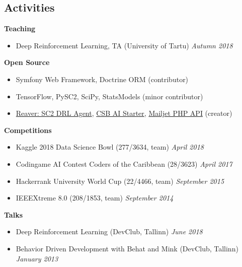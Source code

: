 \documentclass[margin,line]{res}
\begin{document}
\begin{resume}
\section{\sc Activities}
{\bf Teaching}
\begin{itemize}
    \item[ ] Deep Reinforcement Learning, TA (University of Tartu) \hfill {\it Autumn 2018}
\end{itemize}

\vspace*{-.1in}
{\bf Open Source}
\begin{itemize}
    \item[ ] Symfony Web Framework, Doctrine ORM (contributor)
    \item[ ] TensorFlow, PySC2, SciPy, StatsModels (minor contributor)
    \item[ ] \href{https://github.com/Inoryy/reaver-pysc2}{Reaver: SC2 DRL Agent}, \href{https://github.com/Inoryy/csb-ai-starter}{CSB AI Starter}, \href{https://github.com/KnpLabs/mailjet-api-php}{Mailjet PHP API} (creator)
\end{itemize}

\vspace*{-.1in}
{\bf Competitions}
\begin{itemize}
\item[ ] Kaggle 2018 Data Science Bowl (277/3634, team) \hfill {\it April 2018}
\item[ ] Codingame AI Contest Coders of the Caribbean (28/3623) \hfill {\it April 2017}
\item[ ] Hackerrank University World Cup (22/4466, team) \hfill {\it September 2015}
\item[ ] IEEEXtreme 8.0 (208/1853, team) \hfill {\it September 2014}
\end{itemize}

\vspace*{-.1in}
{\bf Talks}
\begin{itemize}
    \item[ ] Deep Reinforcement Learning (DevClub, Tallinn) \hfill {\it June 2018}
    \item[ ] Behavior Driven Development with Behat and Mink (DevClub, Tallinn) \hfill {\it January 2013}
\end{itemize}


\end{resume}
\end{document}
